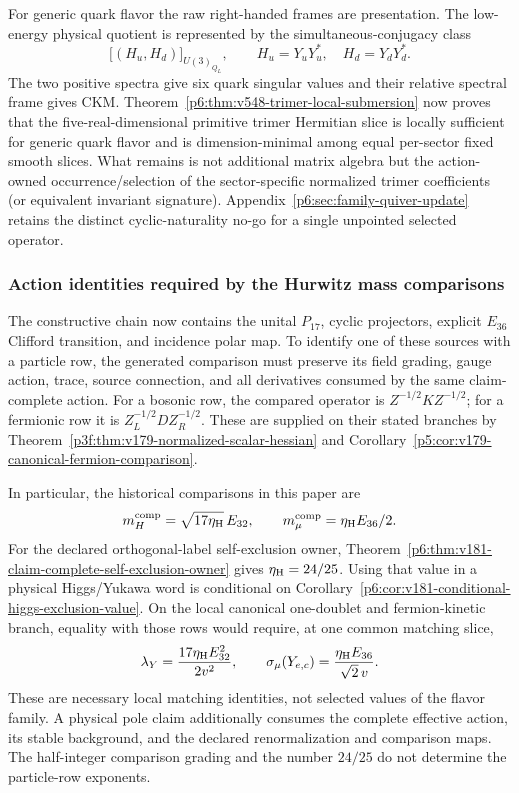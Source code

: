 \documentclass[11pt,a4paper]{article}
\newcommand{\etaH}{\eta_{\rm H}}
\begin{document}
For generic quark flavor the raw right-handed frames are presentation.  The
low-energy physical quotient is represented by the simultaneous-conjugacy
class
\[
 \bigl[(H_u,H_d)\bigr]_{U(3)_{Q_L}},\qquad
 H_u=Y_uY_u^*,\quad H_d=Y_dY_d^*.
\]
The two positive spectra give six quark singular values and their relative
spectral frame gives CKM.  Theorem~\ref{p6:thm:v548-trimer-local-submersion} now proves that the
five-real-dimensional primitive trimer Hermitian slice is locally sufficient
for generic quark flavor and is dimension-minimal among equal per-sector
fixed smooth slices.  What remains is not additional matrix algebra but the
action-owned occurrence/selection of the sector-specific normalized trimer
coefficients (or equivalent invariant signature).  Appendix~\ref{p6:sec:family-quiver-update}
retains the distinct cyclic-naturality no-go for a single unpointed selected
operator.




\subsubsection{Action identities required by the Hurwitz mass comparisons}
\label{p6:sec:v179-action-mass-comparison}

The constructive chain now contains the unital \(P_{17}\), cyclic
projectors, explicit \(E_{36}\) Clifford transition, and incidence polar
map.  To identify one of these sources with a particle row, the generated
comparison must preserve its field grading, gauge action, trace, source
connection, and all derivatives consumed by the same claim-complete action.
For a bosonic row, the compared operator is
\(Z^{-1/2}KZ^{-1/2}\); for a fermionic row it is
\(Z_L^{-1/2}D Z_R^{-1/2}\).  These are supplied on their stated branches by
Theorem~\ref{p3f:thm:v179-normalized-scalar-hessian} and
Corollary~\ref{p5:cor:v179-canonical-fermion-comparison}.

In particular, the historical comparisons in this paper are
\[
 m_H^{\rm comp}=\sqrt{17\etaH}\,E_{32},\qquad
 m_\mu^{\rm comp}=\etaH E_{36}/2.
\]
For the declared orthogonal-label self-exclusion owner,
Theorem~\ref{p6:thm:v181-claim-complete-self-exclusion-owner} gives
$\etaH=24/25$.  Using that value in a physical Higgs/Yukawa word is
conditional on Corollary~\ref{p6:cor:v181-conditional-higgs-exclusion-value}.
On the local canonical one-doublet and fermion-kinetic branch, equality
with those rows would require, at one common matching slice,
\begin{equation}
\label{p6:eq:v179-higgs-muon-action-targets}
 \lambda_Y=\frac{17\etaH E_{32}^2}{2v^2},\qquad
 \sigma_\mu(Y_{e,c})=\frac{\etaH E_{36}}{\sqrt2\,v}.
\end{equation}
These are necessary local matching identities, not selected values of
the flavor family.  A physical pole claim additionally consumes the
complete effective action, its stable background, and the declared
renormalization and comparison maps.  The half-integer comparison grading
and the number \(24/25\) do not determine the particle-row exponents.
\end{document}
